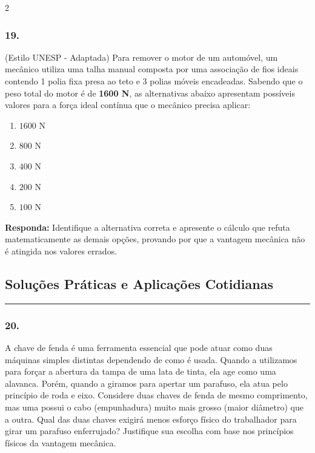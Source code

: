\documentclass[twoside, 10pt, a4paper]{article}
\newlength{\espacoPosTitulo}\setlength{\espacoPosTitulo}{0.3cm}
\newlength{\espacoQuestao}\setlength{\espacoQuestao}{0.2cm}
\newlength{\espacoAlt}\setlength{\espacoAlt}{0.2cm}
\begin{document}
\begin{multicols*}{2}
\subsubsection*{19.} (Estilo UNESP - Adaptada) Para remover o motor de um automóvel, um mecânico utiliza uma talha manual composta por uma associação de fios ideais contendo 1 polia fixa presa ao teto e 3 polias móveis encadeadas. Sabendo que o peso total do motor é de \textbf{1600 N}, as alternativas abaixo apresentam possíveis valores para a força ideal contínua que o mecânico precisa aplicar:
\begin{enumerate}[label=\alph*), itemsep=\espacoAlt]
    \item $ 1600 \text{ N} $
    \item $ 800 \text{ N} $
    \item $ 400 \text{ N} $
    \item $ 200 \text{ N} $
    \item $ 100 \text{ N} $
\end{enumerate}
\begin{boxresponda}
\textbf{Responda:} Identifique a alternativa correta e apresente o cálculo que refuta matematicamente as demais opções, provando por que a vantagem mecânica não é atingida nos valores errados.
\end{boxresponda}
\par\vspace{\espacoQuestao}

\subsection*{Soluções Práticas e Aplicações Cotidianas}
\vspace{-0.2cm}\noindent\rule{\linewidth}{1.5pt} 
\par\vspace{\espacoPosTitulo}
\subsubsection*{20.} A chave de fenda é uma ferramenta essencial que pode atuar como duas máquinas simples distintas dependendo de como é usada. Quando a utilizamos para forçar a abertura da tampa de uma lata de tinta, ela age como uma alavanca. Porém, quando a giramos para apertar um parafuso, ela atua pelo princípio de roda e eixo. Considere duas chaves de fenda de mesmo comprimento, mas uma possui o cabo (empunhadura) muito mais grosso (maior diâmetro) que a outra. Qual das duas chaves exigirá menos esforço físico do trabalhador para girar um parafuso enferrujado? Justifique sua escolha com base nos princípios físicos da vantagem mecânica.
\par\vspace{\espacoQuestao}


\end{multicols*}
\end{document}

